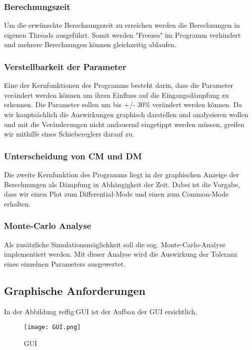 \subsubsection{Berechnungszeit}\label{subsubsec:berechnungszeit}
Um die erwünschte Berechnungszeit zu erreichen werden die Berechnungen in eigenen Threads ausgeführt. Somit werden "Freezes" im Programm verhindert und mehrere Berechnungen können gleichzeitig ablaufen. 
\bigskip
\subsubsection{Verstellbarkeit der Parameter}\label{subsubsec:verstellbarkeitderparameter}
Eine der Kernfunktionen des Programms besteht darin, dass die Parameter verändert werden können um ihren Einfluss auf die Eingangsdämpfung zu erkennen. Die Parameter sollen um bis +/- 30\% verändert werden können. Da wir hauptsächlich die Auswirkungen graphisch darstellen und analysieren wollen und mit die Veränderungen nicht andauernd eingetippt werden müssen, greifen wir mithilfe eines Schiebereglers darauf zu. 
\bigskip
\subsubsection{Unterscheidung von CM und DM}\label{subsubsec:unterschiedCmDm}
Die zweite Kernfunktion des Programms liegt in der graphischen Anzeige der Berechnungen als Dämpfung in Abhängigkeit der Zeit. Dabei ist die Vorgabe, dass wir einen Plot zum Differential-Mode und einen zum Common-Mode erhalten.
		
\bigskip
\subsubsection{Monte-Carlo Analyse}\label{subsubsec:montecarlo}
Als zusätzliche Simulationsmöglichkeit soll die sog. Monte-Carlo-Analyse implementiert werden. Mit dieser Analyse wird die Auswirkung der Toleranz eines einzelnen Parameters ausgewertet. 
		
		
\subsection{Graphische Anforderungen} \label{subsec:graphischeanforderungen}
In der Abbildung ref{fig:GUI} ist der Aufbau der GUI ersichtlich.

\begin{figure}[H]
	\centering
	\texttt{[image: GUI.png]}
	\caption{GUI}
	\label{fig:GUI}
\end{figure}

